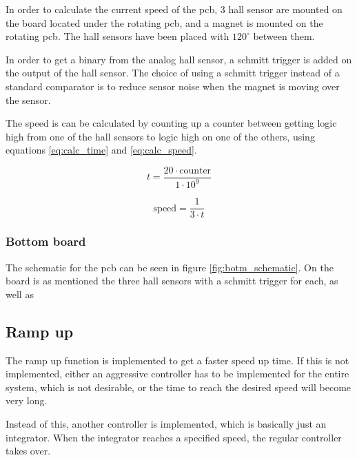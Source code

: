 In order to calculate the current speed of the pcb, 3 hall sensor are mounted on the board located under the rotating pcb, and a magnet is mounted on the rotating pcb.
The hall sensors have been placed with $120^{\circ}$ between them.

In order to get a binary from the analog hall sensor, a schmitt trigger is added on the output of the hall sensor.
The choice of using a schmitt trigger instead of a standard comparator is to reduce sensor noise when the magnet is moving over the sensor.

The speed is can be calculated by counting up a counter between getting logic high from one of the hall sensors to  logic high on one of the others, using equations  \ref{eq:calc_time} and \ref{eq:calc_speed}.

\begin{equation} \label{eq:calc_time}
 t = \frac{20\cdot \text{counter}}{1\cdot 10^9}
\end{equation}

\begin{equation} \label{eq:calc_speed}
 \text{speed} = \frac{1}{3\cdot t}
\end{equation}

\subsubsection{Bottom board}
The schematic for the pcb can be seen in figure \ref{fig:botm_schematic}.
On the board is as mentioned the three hall sensors with a schmitt trigger for each, as well as 	


\subsection{Ramp up}

The ramp up function is implemented to get a faster speed up time.
If this is not implemented, either an aggressive controller has to be implemented for the entire system, which is not desirable, or the time to reach the desired speed will become very long.

Instead of this, another controller is implemented, which is basically just an integrator.
When the integrator reaches a specified speed, the regular controller takes over. 